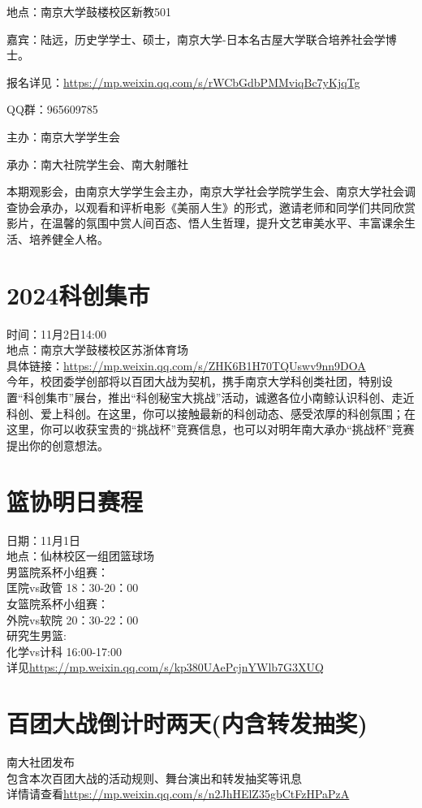 \documentclass[letterpaper, 12pt]{article}
\begin{document}
\begin{multicols}{2}
地点：南京大学鼓楼校区新教501

嘉宾：陆远，历史学学士、硕士，南京大学-日本名古屋大学联合培养社会学博士。

报名详见：\url{https://mp.weixin.qq.com/s/rWCbGdbPMMviqBc7yKjqTg}

QQ群：965609785

主办：南京大学学生会

承办：南大社院学生会、南大射雕社

本期观影会，由南京大学学生会主办，南京大学社会学院学生会、南京大学社会调查协会承办，以观看和评析电影《美丽人生》的形式，邀请老师和同学们共同欣赏影片，在温馨的氛围中赏人间百态、悟人生哲理，提升文艺审美水平、丰富课余生活、培养健全人格。
\section{2024科创集市}
时间：11月2日14:00\\
地点：南京大学鼓楼校区苏浙体育场\\
具体链接：\url{https://mp.weixin.qq.com/s/ZHK6B1H70TQUswv9nn9DOA}\\
今年，校团委学创部将以百团大战为契机，携手南京大学科创类社团，特别设置“科创集市”展台，推出“科创秘宝大挑战”活动，诚邀各位小南鲸认识科创、走近科创、爱上科创。在这里，你可以接触最新的科创动态、感受浓厚的科创氛围；在这里，你可以收获宝贵的“挑战杯”竞赛信息，也可以对明年南大承办“挑战杯”竞赛提出你的创意想法。



\section{篮协明日赛程}
日期：11月1日\\
地点：仙林校区一组团篮球场\\
男篮院系杯小组赛：\\
匡院vs政管 18：30-20：00\\
女篮院系杯小组赛：\\
外院vs软院 20：30-22：00\\
研究生男篮:\\
化学vs计科 16:00-17:00\\
详见\url{https://mp.weixin.qq.com/s/kp380UAePcjnYWlb7G3XUQ}

\section{百团大战倒计时两天(内含转发抽奖)}
南大社团发布\\
包含本次百团大战的活动规则、舞台演出和转发抽奖等讯息\\
详情请查看\url{https://mp.weixin.qq.com/s/n2JhHElZ35gbCtFzHPaPzA}\\

\end{multicols}
\end{document}
